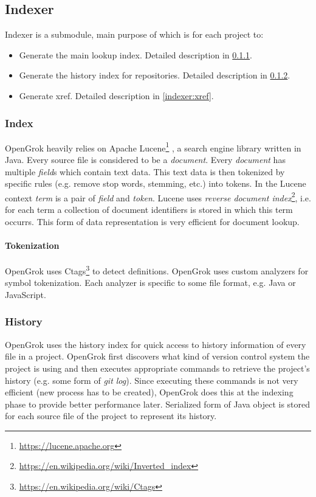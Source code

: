 \subsection{Indexer}
\label{indexer}

Indexer is a submodule, main purpose of which is for each project to:
\begin{itemize}
    \item Generate the main lookup index. Detailed description in \ref{indexer:index}.
    \item Generate the history index for repositories. Detailed description in \ref{indexer:history}.
    \item Generate xref. Detailed description in \ref{indexer:xref}.
\end{itemize}

\subsubsection{Index}
\label{indexer:index}

OpenGrok heavily relies on Apache Lucene\footnote{\url{https://lucene.apache.org}} \citep{lucene_in_action}, a search engine library
written in Java. Every source file is considered to be a \textit{document}. Every \textit{document} has multiple
\textit{field}s which contain text data. This text data is then tokenized by specific rules (e.g. remove stop words,
stemming, etc.) into tokens. In the Lucene context \textit{term} is a pair of \textit{field} and \textit{token}.
Lucene uses \textit{reverse document index}\footnote{\url{https://en.wikipedia.org/wiki/Inverted_index}},
i.e. for each term a collection of document identifiers is stored in which this term occurrs.
This form of data representation is very efficient for document lookup.

\paragraph{Tokenization}
OpenGrok uses Ctags\footnote{\url{https://en.wikipedia.org/wiki/Ctags}} to detect definitions.
OpenGrok uses custom analyzers for symbol tokenization. Each analyzer is specific to some file format, e.g. Java or JavaScript.

\subsubsection{History}
\label{indexer:history}

OpenGrok uses the history index for quick access to history information of every file in a project. OpenGrok first discovers
what kind of version control system the project is using and then executes appropriate commands to retrieve the project's
history (e.g. some form of \textit{git log}). Since executing these commands is not very efficient (new process has to
be created), OpenGrok does this at the indexing phase to provide better performance later. Serialized form of Java object
is stored for each source file of the project to represent its history.


